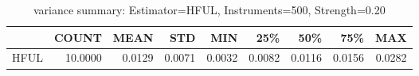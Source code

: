 \begin{table}[ht]
\centering
\caption{variance summary: Estimator=HFUL, Instruments=500, Strength=0.20}
\begin{tabular}{lrrrrrrrr}
\toprule
 & COUNT & MEAN & STD & MIN & 25\% & 50\% & 75\% & MAX \\
\midrule
HFUL & 10.0000 & 0.0129 & 0.0071 & 0.0032 & 0.0082 & 0.0116 & 0.0156 & 0.0282 \\
\bottomrule
\end{tabular}
\end{table}
